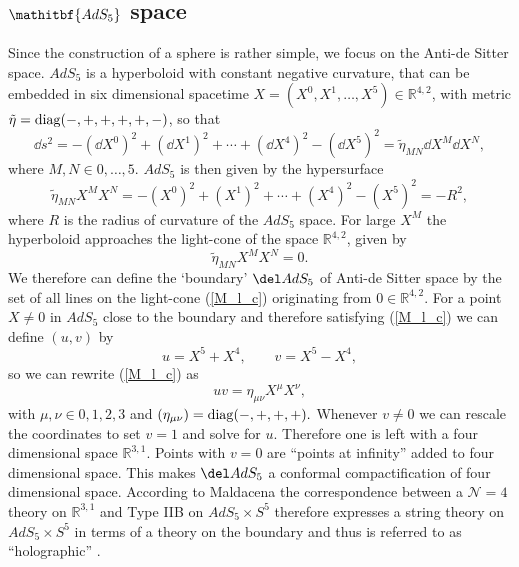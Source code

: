 \subsection[$AdS_{5}$ space]{$\mathitbf{AdS_{5}}$ space}\label{AdS5}
Since the construction of a sphere is rather simple, we focus on the Anti-de Sitter space. $AdS_{5}$ is a hyperboloid with constant negative curvature, that can be embedded in six dimensional  spacetime $X = (X^{0},X^{1},\ldots,X^{5}) \in \mathbb{R}^{4,2}$, with metric ${\tilde{\eta} = {\rm diag}(-,+,+,+,+,-)}$, so that
\begin{equation}
\dd s^{2} = -\left(\dd X^{0}\right)^{2} + \left(\dd X^{1}\right)^{2} + \cdots + \left(\dd X^{4}\right)^{2} - \left(\dd X^{5}\right)^{2} = \tilde{\eta}_{MN} \dd X^{M}\dd X^{N},
\end{equation}
where $M,N \in {0,\ldots,5}$. $AdS_{5}$ is then given by the hypersurface
\begin{equation}
\tilde{\eta}_{MN}X^{M}X^{N} = -\left(X^{0}\right)^{2} + \left(X^{1}\right)^{2} + \cdots + \left(X^{4}\right)^{2} - \left(X^{5}\right)^{2} = -R^{2},
\label{hyperbol}
\end{equation}
where $R$ is the radius of curvature of the $AdS_{5}$ space. For large $X^{M}$ the hyperboloid approaches the light-cone of the  space $\mathbb{R}^{4,2}$, given by
\begin{equation}
\tilde{\eta}_{MN}X^{M}X^{N} = 0.
\label{M_l_c}
\end{equation}
We therefore can define the `boundary' $\del AdS_{5}$ of Anti-de Sitter space by the set of all lines on the light-cone (\ref{M_l_c}) originating from $0 \in \mathbb{R}^{4,2}$. For a point $X \neq 0$ in $AdS_{5}$ close to the boundary and therefore satisfying (\ref{M_l_c}) we can define $(u,v)$ by
\begin{equation}
u = X^{5}+X^{4}, \qquad v = X^{5}-X^{4},
\end{equation}
so we can rewrite (\ref{M_l_c}) as
\begin{equation}
uv = \eta_{\mu \nu} X^{\mu}X^{\nu},
\end{equation}
with $\mu,\nu \in {0,1,2,3}$ and $\left(\eta_{\mu \nu}\right) = {\rm diag}(-,+,+,+).$ Whenever $v \neq 0$ we can rescale the coordinates to set $v = 1$ and solve for $u$. Therefore one is left with a four dimensional  space $\mathbb{R}^{3,1}$. Points with $v=0$ are ``points at infinity'' added to four dimensional  space. This makes $\del AdS_{5}$ a conformal compactification of four dimensional  space. According to Maldacena \cite{maldacena1} the correspondence between a $\mathcal{N}=4$ theory on $\mathbb{R}^{3,1}$ and Type IIB on $AdS_{5}\times S^{5}$ therefore expresses a string theory on $AdS_{5}\times S^{5}$ in terms of a theory on the boundary and thus is referred to as ``holographic'' \cite{Witten:1998qj}.
%
%
